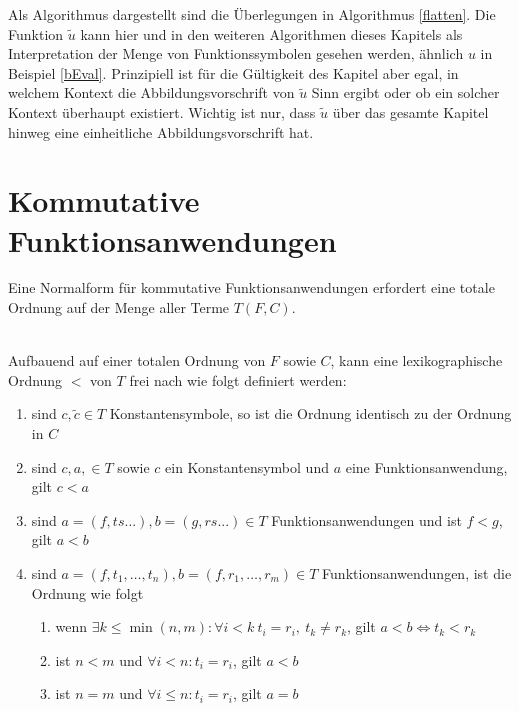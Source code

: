 Als Algorithmus dargestellt sind die Überlegungen in Algorithmus \ref{flatten}.
Die Funktion $\tilde u$ kann hier und in den weiteren Algorithmen dieses Kapitels als \grqq{} Interpretation der Menge von Funktionssymbolen gesehen werden, ähnlich $u$ in Beispiel \ref{bEval}. Prinzipiell ist für die Gültigkeit des Kapitel aber egal, in welchem Kontext die Abbildungsvorschrift von $\tilde u$ Sinn ergibt oder ob ein solcher Kontext überhaupt existiert. Wichtig ist nur, dass $\tilde u$ über das gesamte Kapitel hinweg eine einheitliche Abbildungsvorschrift hat.

\begin{algorithm}
\DontPrintSemicolon
\caption{$\Const{flatten} \colon T \rightarrow T$}\label{flatten}

\end{algorithm}

\section{Kommutative Funktionsanwendungen} \label{subsecNormalSortieren}
Eine Normalform für kommutative Funktionsanwendungen erfordert eine totale Ordnung auf der Menge aller Terme $T(F, C)$. 

\begin{definition}~\\ \label{defOrdnungKleiner}
Aufbauend auf einer totalen Ordnung von $F$ sowie $C$, kann eine lexikographische Ordnung $<$ von $T$ frei nach \cite{LexikografischeOrdnung} wie folgt definiert werden: 
\begin{enumerate}
	\item{sind $c, \tilde{c} \in T$ Konstantensymbole, so ist die Ordnung identisch zu der Ordnung in $C$}
	\item{sind $c, a, \in T$ sowie $c$ ein Konstantensymbol und $a$ eine Funktionsanwendung, gilt $c < a$ }
	\item{sind $a = (f, ts...), b = (g, rs...) \in T$ Funktionsanwendungen und ist $f < g$, gilt $a < b$}
	\item{sind $a = (f, t_1, \dots, t_n), b = (f, r_1, \dots, r_m) \in T$ Funktionsanwendungen, ist die Ordnung wie folgt}
	\begin{enumerate}
		\item{wenn $\exists k \leq \min{(n, m)} \colon \forall i < k ~ t_i = r_i ,~ t_k \neq r_k $, gilt ${a < b \iff t_k < r_k}$}
		\item{ist $n < m$ und $\forall i < n\colon t_i = r_i$, gilt $a < b$}
		\item{ist $n = m$ und $\forall i \leq n\colon t_i = r_i$, gilt $a = b$}
	\end{enumerate}
\end{enumerate}

\end{definition}

